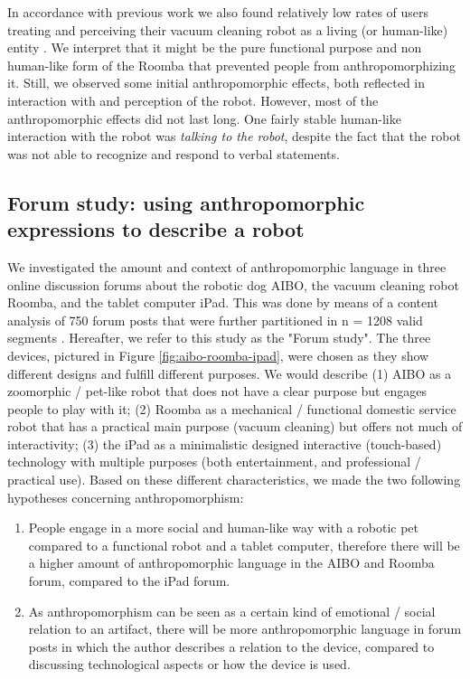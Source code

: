 \documentclass{frontiersSCNS} %
\begin{document}
In accordance with previous work we also found relatively low rates of users
treating and perceiving their vacuum cleaning robot as a living (or human-like)
entity \citep{sung_housewives_2008}. We interpret that it might be the pure
functional purpose and non human-like form of the Roomba that prevented people
from anthropomorphizing it. Still, we observed some initial anthropomorphic
effects, both reflected in interaction with and perception of the robot.
However, most of the anthropomorphic effects did not last long. One fairly
stable human-like interaction with the robot was \textit{talking to the robot},
despite the fact that the robot was not able to recognize and respond to verbal
statements.


\subsection{Forum study: using anthropomorphic expressions to describe a robot}

We investigated the amount and context of anthropomorphic language in three
online discussion forums about the robotic dog AIBO, the vacuum cleaning robot
Roomba, and the tablet computer iPad. This was done by means of a content
analysis of 750 forum posts that were further partitioned in n = 1208 valid
segments \citep{fink_anthropomorphic_2012}. Hereafter, we refer to this study as
the "Forum study". The three devices, pictured in Figure
\ref{fig:aibo-roomba-ipad}, were chosen as they show different designs and
fulfill different purposes. We would describe (1) AIBO as a zoomorphic /
pet-like robot that does not have a clear purpose but engages people to play
with it; (2) Roomba as a mechanical / functional domestic service robot that has
a practical main purpose (vacuum cleaning) but offers not much of interactivity;
(3) the iPad as a minimalistic designed interactive (touch-based) technology
with multiple purposes (both entertainment, and professional / practical use).
Based on these different characteristics, we made the two following hypotheses
concerning anthropomorphism:

\begin{enumerate}
    	\item People engage in a more social and human-like way with a robotic pet compared to a functional robot and a tablet computer, therefore there will be a higher amount of anthropomorphic language in the AIBO and Roomba forum, compared to the iPad forum.
    	\item As anthropomorphism can be seen as a certain kind of emotional / social relation to an artifact, there will be more anthropomorphic language in forum posts in which the author describes a relation to the device, compared to discussing technological aspects or how the device is used.
\end{enumerate}
\end{document}
